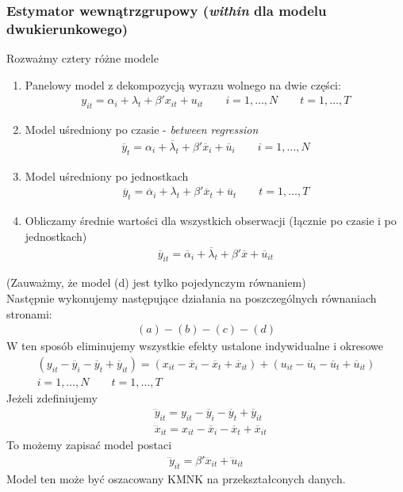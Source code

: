 \subsubsection{Estymator wewnątrzgrupowy (\emph{within} dla modelu dwukierunkowego)}
Rozważmy cztery różne modele
\begin{enumerate}[Model (a):-]
\item Panelowy model z dekompozycją wyrazu wolnego na dwie części:
\begin{gather*}
y_{it}=\alpha _i+\lambda_t+\beta'x_{it}+u_{it}
\qquad i=1,\dots,N
\qquad t=1,\dots,T
\end{gather*}
\item Model uśredniony po czasie - \emph{between regression}
\begin{gather*}
\overline y_t=\alpha_i+\overline \lambda_t+\beta'\overline x_i +\overline u_i
\qquad i=1,\dots,N
\end{gather*}
\item Model uśredniony po jednostkach
\begin{gather*}
\overline y_t=\overline \alpha _i +\lambda _t+\beta'\overline x_t+\overline u_t
\qquad t=1,\dots,T
\end{gather*}
\item Obliczamy średnie wartości dla wszystkich obserwacji (łącznie po czasie i po jednostkach)
\begin{gather*}
\overline y _{it}=\overline \alpha _i+\overline \lambda _t+\beta '\overline x+\overline u_{it}
\end{gather*}
\end{enumerate}
(Zauważmy, że model (d) jest tylko pojedynczym równaniem)\\
Następnie wykonujemy następujące działania na poszczególnych równaniach stronami:
\begin{gather*}
(a)-(b)-(c)-(d)
\end{gather*}
W ten sposób eliminujemy wszystkie efekty ustalone indywidualne i okresowe
\begin{gather*}
\left(y_{it}-\overline y_i-\overline y_t+\overline y_{it}\right)=
\left(x_{it}-\overline x_i-\overline x_t+\overline x_{it}\right)+
\left(u_{it}-\overline u_i-\overline u_t+\overline u_{it}\right)\\
i=1,\dots,N
\qquad t=1,\dots,T
\end{gather*}
Jeżeli zdefiniujemy
\begin{align*}
&\dddot y_{it}=y_{it}-\overline y_i-\overline y_t+\overline y_{it}\\
&\dddot x_{it}=x_{it}-\overline x_i-\overline x_t+\overline x_{it}
\end{align*}
To możemy zapisać model postaci
\begin{gather*}
\dddot y_{it}=\beta'\dddot x_{it}+\dddot u_{it}
\end{gather*}
Model ten może być oszacowany KMNK na przekształconych danych.
